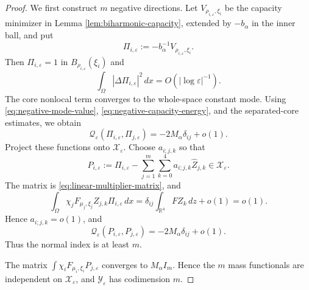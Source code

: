 \documentclass[11pt]{article}
\numberwithin{equation}{section}
\begin{document}
\begin{proof}
We first construct $m$ negative directions.  Let
$V_{\rho_{i,\varepsilon},\xi_i}$ be the capacity minimizer in Lemma
\ref{lem:biharmonic-capacity}, extended by $-b_\alpha$ in the inner
ball, and put
\begin{equation*}
\Pi_{i,\varepsilon}
:=-b_\alpha^{-1}V_{\rho_{i,\varepsilon},\xi_i}.
\end{equation*}
Then $\Pi_{i,\varepsilon}=1$ in
$B_{\rho_{i,\varepsilon}}(\xi_i)$ and
\begin{equation}\label{eq:negative-capacity-energy}
\int_\Omega|\Delta\Pi_{i,\varepsilon}|^2\,dx
=O(|\log\varepsilon|^{-1}).
\end{equation}
The core nonlocal term converges to the whole-space constant mode.
Using \eqref{eq:negative-mode-value},
\eqref{eq:negative-capacity-energy}, and the separated-core
estimates, we obtain
\begin{equation*}
\mathcal Q_\varepsilon
(\Pi_{i,\varepsilon},\Pi_{j,\varepsilon})
=-2M_\alpha\delta_{ij}+o(1).
\end{equation*}
Project these functions onto $\mathcal X_\varepsilon$.  Choose
$a_{i;j,k}$ so that
\begin{equation*}
P_{i,\varepsilon}
:=\Pi_{i,\varepsilon}
-\sum_{j=1}^{m}\sum_{k=0}^{4}
a_{i;j,k}\widehat Z_{j,k}
\in\mathcal X_\varepsilon.
\end{equation*}
The matrix is \eqref{eq:linear-multiplier-matrix}, and
\begin{equation*}
\int_\Omega
\chi_jF_{\mu_j,\xi_j}Z_{j,k}\Pi_{i,\varepsilon}\,dx
=\delta_{ij}\int_{\mathbb R^4}FZ_k\,dz+o(1)=o(1).
\end{equation*}
Hence $a_{i;j,k}=o(1)$, and
\begin{equation*}
\mathcal Q_\varepsilon
(P_{i,\varepsilon},P_{j,\varepsilon})
=-2M_\alpha\delta_{ij}+o(1).
\end{equation*}
Thus the normal index is at least $m$.

The matrix
$\int\chi_iF_{\mu_i,\xi_i}P_{j,\varepsilon}$ converges to
$M_\alpha I_m$.  Hence the $m$ mass functionals are independent on
$\mathcal X_\varepsilon$, and
$\mathcal Y_\varepsilon$ has codimension $m$.


\end{proof}
\end{document}
